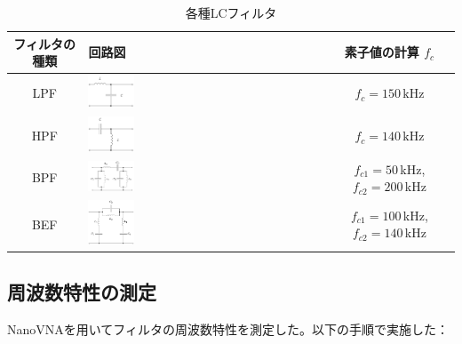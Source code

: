 \documentclass[11pt,dvipdfmx]{jarticle}
\begin{document}
\begin{table}[H]
  \centering
  \caption{各種LCフィルタ}
  \label{tab:各種LCフィルタ}
  \begin{tabular}{|c|m{}|c|}
    \hline
    フィルタの種類 & 回路図 & 素子値の計算 $f_c$ \\
    \hline
    LPF & \includegraphics[width=0.2\textwidth]{fig/LPF.drawio.png} & $f_c = 150\,\mathrm{kHz}$ \\
    \hline
    HPF & \includegraphics[width=0.2\textwidth]{fig/HPF.drawio.png} & $f_c = 140\,\mathrm{kHz}$ \\
    \hline
    BPF & \includegraphics[width=0.2\textwidth]{fig/BPF.drawio.png} & $f_{c1} = 50\,$kHz,$f_{c2} = 200\,$kHz \\
    \hline
    BEF & \includegraphics[width=0.2\textwidth]{fig/BEF.drawio.png} & $f_{c1} = 100\,$kHz,$f_{c2} = 140\,$kHz \\
    \hline
  \end{tabular}
\end{table}
\subsection{周波数特性の測定}
NanoVNAを用いてフィルタの周波数特性を測定した。以下の手順で実施した：
\end{document}
